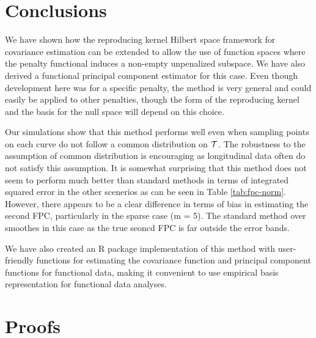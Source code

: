\section{Conclusions} 

\label{sec:conclusions}

We have shown how the reproducing kernel Hilbert space framework for covariance estimation can be extended to allow the use of function spaces where the penalty functional induces a non-empty unpenalized subspace. We have also derived a functional principal component estimator for this case. Even though development here was for a specific penalty, the method is very general and could easily be applied to other penalties, though the form of the reproducing kernel and the basis for the null space will depend on this choice. 

Our simulations show that this method performs well even when sampling points on each curve do not follow a common distribution on $\mathcal{T}$. The robustness to the assumption of common distribution is encouraging as longitudinal data often do not satisfy this assumption. It is somewhat surprising that this method does not seem to perform much better than standard methods in terms of integrated squared error in the other scenerios as can be seen in Table \ref{tab:fpc-norm}. However, there appears to be a clear difference in terms of bias in estimating the second FPC, particularly in the sparse case (m = 5). The standard method over smoothes in this case as the true seoncd FPC is far outside the error bands.   

We have also created an R package implementation of this method with user-friendly functions for estimating the covariance function and principal component functions for functional data, making it convenient to use empirical basis representation for functional data analyses. 

\section{Proofs} 

\label{sec:proofs}

